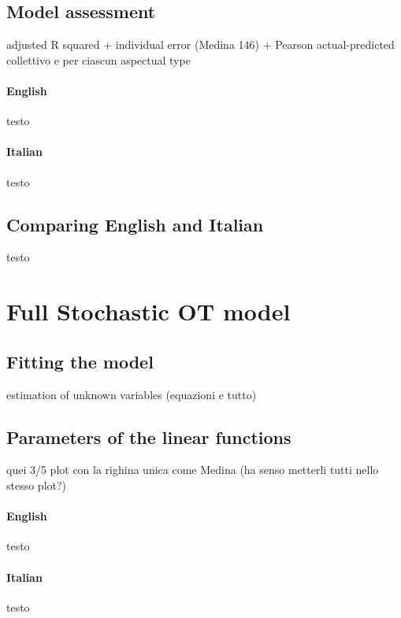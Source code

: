 \subsection{Model assessment} 

adjusted R squared + 
individual error (Medina 146) +
Pearson actual-predicted collettivo e per ciascun aspectual type

\paragraph{English} testo

\paragraph{Italian} testo


\subsection{Comparing English and Italian} 

testo



\section{Full Stochastic OT model} 


\subsection{Fitting the model} 

estimation of unknown variables (equazioni e tutto)


\subsection{Parameters of the linear functions} 

quei 3/5 plot con la righina unica come Medina (ha senso metterli tutti nello stesso plot?)

\paragraph{English} testo

\paragraph{Italian} testo



